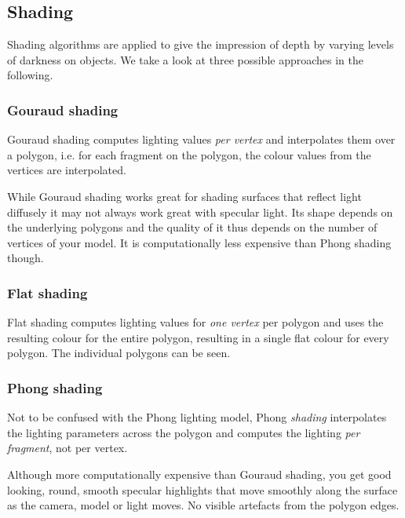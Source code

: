 \documentclass{panikzettel}
\begin{document}
\begin{halfboxl}
\subsection{Shading}
Shading algorithms are applied to give the impression of depth by varying levels of darkness on objects. We take a look at three possible approaches in the following.

\subsubsection*{Gouraud shading}
Gouraud shading computes lighting values \emph{per vertex} and interpolates them over a polygon, i.e. for each fragment on the polygon, the colour values from the vertices are interpolated.

While Gouraud shading works great for shading surfaces that reflect light diffusely it may not always work great with specular light. Its shape depends on the underlying polygons and the quality of it thus depends on the number of vertices of your model. It is computationally less expensive than Phong shading though.
\end{halfboxl}%
\begin{halfboxr}
\subsubsection*{Flat shading}
Flat shading computes lighting values for \emph{one vertex} per polygon and uses the resulting colour for the entire polygon, resulting in a single flat colour for every polygon. The individual polygons can be seen.

\subsubsection*{Phong shading}
Not to be confused with the Phong lighting model, Phong \emph{shading} interpolates the lighting parameters across the polygon and computes the lighting \emph{per fragment}, not per vertex.

Although more computationally expensive than Gouraud shading, you get good looking, round, smooth specular highlights that move smoothly along the surface as the camera, model or light moves. No visible artefacts from the polygon edges.
\end{halfboxr}
\end{document}
